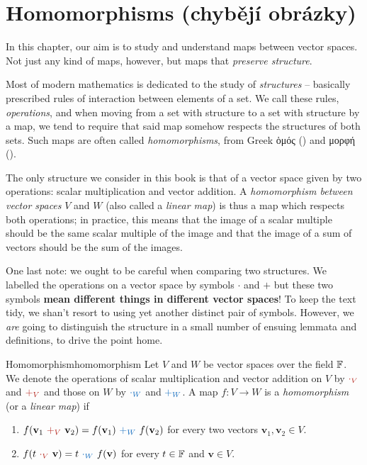 \chapter{Homomorphisms (chybějí obrázky)}
\label{chap:homomorphisms}

In this chapter, our aim is to study and understand maps between vector spaces.
Not just any kind of maps, however, but maps that \emph{preserve structure}.

Most of modern mathematics is dedicated to the study of \emph{structures} --
basically prescribed rules of interaction between elements of a set. We call
these rules, \emph{operations}, and when moving from a set with structure to a
set with structure by a map, we tend to require that said map somehow respects
the structures of both sets. Such maps are often called \emph{homomorphisms},
from Greek ὁμός () and μορφή ().

The only structure we consider in this book is that of a vector space given by
two operations: scalar multiplication and vector addition. A \emph{homomorphism
between vector spaces} $V$ and $W$ (also called a \emph{linear map}) is thus a
map which respects both operations; in practice, this means that the image of a
scalar multiple should be the same scalar multiple of the image and that the
image of a sum of vectors should be the sum of the images.

One last note: we ought to be careful when comparing two structures. We labelled
the operations on a vector space by symbols $ \cdot $ and $+$ but these two
symbols \textbf{mean different things in different vector spaces}! To keep the
text tidy, we shan't resort to using yet another distinct pair of symbols.
However, we \emph{are} going to distinguish the structure in a small number of
ensuing lemmata and definitions, to drive the point home.

\begin{definition}{Homomorphism}{homomorphism}
 Let $V$ and $W$ be vector spaces over the field $\mathbb{F}$. We denote the operations
 of scalar multiplication and vector addition on $V$ by $\clr{ \cdot _V}$ and
 $\clr{ +_V}$ and those on $W$ by $\clb{ \cdot _W}$ and $\clb{+_W}$. A map $f:V
 \to W$ is a \emph{homomorphism} (or a \emph{linear map}) if
 \begin{enumerate}
  \item $f(\mathbf{v}_1~\clr{+_V}~\mathbf{v}_2) =
   f(\mathbf{v}_1)~\clb{+_W}~f(\mathbf{v}_2)$ for every two vectors
   $\mathbf{v}_1,\mathbf{v}_2 \in V$.
  \item $f(t~\clr{ \cdot _V}~\mathbf{v}) = t~\clb{ \cdot_W}~f(\mathbf{v})$ for
   every $t \in \mathbb{F}$ and $\mathbf{v} \in V$.
 \end{enumerate}
\end{definition}

